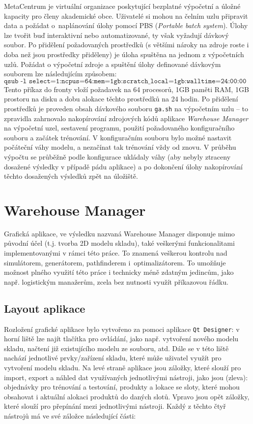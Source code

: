 MetaCentrum je virtuální organizace poskytující bezplatné výpočetní a úložné kapacity pro členy akademické obce. Uživatelé si mohou na čelním uzlu připravit data a požádat o~naplánování úlohy pomocí PBS (\emph{Portable batch system}). Úlohy lze tvořit buď interaktivní nebo automatizované, ty však vyžadují dávkový soubor. Po přidělení požadovaných prostředků (s většími nároky na zdroje roste i doba než jsou prostředky přiděleny) je úloha spuštěna na jednom z výpočetních uzlů. Požádat o výpočetní zdroje a spuštění úlohy definované dávkovým souborem lze následujícím způsobem:
$$\texttt{qsub -l select=1:ncpus=64:mem=1gb:scratch\_local=1gb:walltime=24:00:00 ga.sh}$$
Tento příkaz do fronty vloží požadavek na 64 procesorů, 1GB paměti RAM, 1GB prostoru na disku a dobu alokace těchto prostředků na 24 hodin. Po přidělení prostředků je proveden obsah dávkového souboru \texttt{ga.sh} na výpočetním uzlu -- to zpravidla zahrnovalo nakopírování zdrojových kódů aplikace \emph{Warehouse Manager} na výpočetní uzel, sestavení programu, použití požadovaného konfiguračního souboru a začátek trénování. V konfiguračním souboru bylo možné nastavit počáteční váhy modelu, a nezačínat tak trénování vždy od znovu. V průběhu výpočtu se průběžně podle konfigurace ukládaly váhy (aby nebyly ztraceny dosažené výsledky v případě pádu aplikace) a po dokončení úlohy nakopírování těchto dosažených výsledků zpět na úložiště.

\section{Warehouse Manager}
Grafická aplikace, ve výsledku nazvaná Warehouse Manager disponuje mimo původní účel (t.j. tvorba 2D modelu skladu), také veškerými funkcionalitami implementovanými v rámci této práce. To znamená veškerou kontrolu nad simulátorem, generátorem, pathfinderem i~optimalizátorem. To umožňuje možnost plného využití této práce i technicky méně zdatným jedincům, jako např. logistickým manažerům, zcela bez nutnosti využít příkazovou řádku.

\subsection{Layout aplikace}
Rozložení grafické aplikace bylo vytvořeno za pomoci aplikace \texttt{Qt Designer}: v horní liště lze najít tlačítka pro ovládání, jako např. vytvoření nového modelu skladu, načtení již existujícího modelu ze souboru, atd. Dále se v této liště nachází jednotlivé prvky/zařízení skladu, které může uživatel využít pro vytvoření modelu skladu. Na levé straně aplikace jsou záložky, které slouží pro import, export a náhled dat využívaných jednotlivými nástroji, jako jsou (zleva): objednávky pro trénování a testování, produkty a lokace se sloty, které mohou obsahovat i aktuální alokaci produktů do daných slotů. Vpravo jsou opět záložky, které slouží pro přepínání mezi jednotlivými nástroji. Každý z těchto čtyř nástrojů má ve své záložce následující části:

